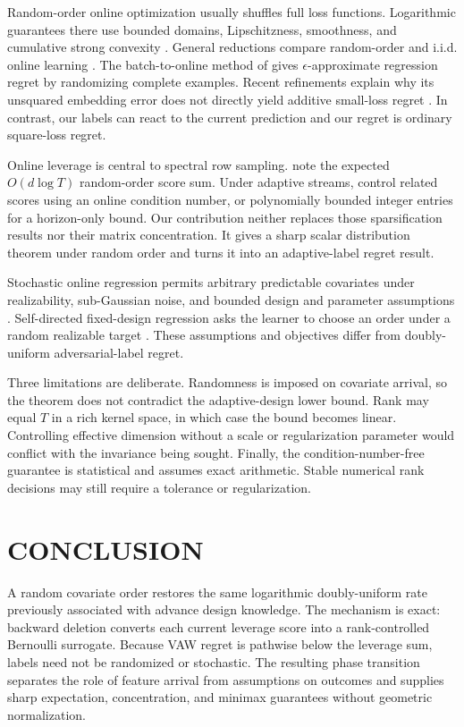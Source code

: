 \documentclass[twoside]{article}
\begin{document}
Random-order online optimization usually shuffles full loss functions. Logarithmic guarantees there use bounded domains, Lipschitzness, smoothness, and cumulative strong convexity \citep{garber2020online,sherman2021optimal}. General reductions compare random-order and i.i.d. online learning \citep{bernasconi2025online}. The batch-to-online method of \citet{dong2023batch} gives $\epsilon$-approximate regression regret by randomizing complete examples. Recent refinements explain why its unsquared embedding error does not directly yield additive small-loss regret \citep{sakaue2026sensitivity}. In contrast, our labels can react to the current prediction and our regret is ordinary square-loss regret.

Online leverage is central to spectral row sampling. \citet{cohen2020online} note the expected $O(d\log T)$ random-order score sum. Under adaptive streams, \citet{goranci2026sparsification} control related scores using an online condition number, or polynomially bounded integer entries for a horizon-only bound. Our contribution neither replaces those sparsification results nor their matrix concentration. It gives a sharp scalar distribution theorem under random order and turns it into an adaptive-label regret result.

Stochastic online regression permits arbitrary predictable covariates under realizability, sub-Gaussian noise, and bounded design and parameter assumptions \citep{ouhamma2021stochastic}. Self-directed fixed-design regression asks the learner to choose an order under a random realizable target \citep{kontonis2023gain}. These assumptions and objectives differ from doubly-uniform adversarial-label regret.

Three limitations are deliberate. Randomness is imposed on covariate arrival, so the theorem does not contradict the adaptive-design lower bound. Rank may equal $T$ in a rich kernel space, in which case the bound becomes linear. Controlling effective dimension without a scale or regularization parameter would conflict with the invariance being sought. Finally, the condition-number-free guarantee is statistical and assumes exact arithmetic. Stable numerical rank decisions may still require a tolerance or regularization.

\section{CONCLUSION}

A random covariate order restores the same logarithmic doubly-uniform rate previously associated with advance design knowledge. The mechanism is exact: backward deletion converts each current leverage score into a rank-controlled Bernoulli surrogate. Because VAW regret is pathwise below the leverage sum, labels need not be randomized or stochastic. The resulting phase transition separates the role of feature arrival from assumptions on outcomes and supplies sharp expectation, concentration, and minimax guarantees without geometric normalization.

\begingroup
\small \setlength{\bibsep}{1pt}

\endgroup

\clearpage

\clearpage
\appendix

\end{document}
